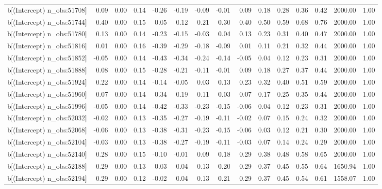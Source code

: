 \begin{table}[ht]
\begin{tabular}{rrrrrrrrrrrrrrr}
  b[(Intercept) n\_obs:51708] & 0.09 & 0.00 & 0.14 & -0.26 & -0.19 & -0.09 & -0.01 & 0.09 & 0.18 & 0.28 & 0.36 & 0.42 & 2000.00 & 1.00 \\ 
  b[(Intercept) n\_obs:51744] & 0.40 & 0.00 & 0.15 & 0.05 & 0.12 & 0.21 & 0.30 & 0.40 & 0.50 & 0.59 & 0.68 & 0.76 & 2000.00 & 1.00 \\ 
  b[(Intercept) n\_obs:51780] & 0.13 & 0.00 & 0.14 & -0.23 & -0.15 & -0.03 & 0.04 & 0.13 & 0.23 & 0.31 & 0.40 & 0.47 & 2000.00 & 1.00 \\ 
  b[(Intercept) n\_obs:51816] & 0.01 & 0.00 & 0.16 & -0.39 & -0.29 & -0.18 & -0.09 & 0.01 & 0.11 & 0.21 & 0.32 & 0.44 & 2000.00 & 1.00 \\ 
  b[(Intercept) n\_obs:51852] & -0.05 & 0.00 & 0.14 & -0.43 & -0.34 & -0.24 & -0.14 & -0.05 & 0.04 & 0.12 & 0.23 & 0.31 & 2000.00 & 1.00 \\ 
  b[(Intercept) n\_obs:51888] & 0.08 & 0.00 & 0.15 & -0.28 & -0.21 & -0.11 & -0.01 & 0.09 & 0.18 & 0.27 & 0.37 & 0.44 & 2000.00 & 1.00 \\ 
  b[(Intercept) n\_obs:51924] & 0.22 & 0.00 & 0.14 & -0.14 & -0.05 & 0.03 & 0.13 & 0.23 & 0.32 & 0.40 & 0.51 & 0.59 & 2000.00 & 1.00 \\ 
  b[(Intercept) n\_obs:51960] & 0.07 & 0.00 & 0.14 & -0.34 & -0.19 & -0.11 & -0.03 & 0.07 & 0.17 & 0.25 & 0.35 & 0.44 & 2000.00 & 1.00 \\ 
  b[(Intercept) n\_obs:51996] & -0.05 & 0.00 & 0.14 & -0.42 & -0.33 & -0.23 & -0.15 & -0.06 & 0.04 & 0.12 & 0.23 & 0.31 & 2000.00 & 1.00 \\ 
  b[(Intercept) n\_obs:52032] & -0.02 & 0.00 & 0.13 & -0.35 & -0.27 & -0.19 & -0.11 & -0.02 & 0.07 & 0.15 & 0.24 & 0.32 & 2000.00 & 1.00 \\ 
  b[(Intercept) n\_obs:52068] & -0.06 & 0.00 & 0.13 & -0.38 & -0.31 & -0.23 & -0.15 & -0.06 & 0.03 & 0.12 & 0.21 & 0.30 & 2000.00 & 1.00 \\ 
  b[(Intercept) n\_obs:52104] & -0.03 & 0.00 & 0.13 & -0.38 & -0.27 & -0.19 & -0.11 & -0.03 & 0.07 & 0.14 & 0.24 & 0.29 & 2000.00 & 1.00 \\ 
  b[(Intercept) n\_obs:52140] & 0.28 & 0.00 & 0.15 & -0.10 & -0.01 & 0.09 & 0.18 & 0.29 & 0.38 & 0.48 & 0.58 & 0.65 & 2000.00 & 1.00 \\ 
  b[(Intercept) n\_obs:52188] & 0.29 & 0.00 & 0.13 & -0.03 & 0.04 & 0.13 & 0.20 & 0.29 & 0.37 & 0.45 & 0.55 & 0.64 & 1650.94 & 1.00 \\ 
  b[(Intercept) n\_obs:52194] & 0.29 & 0.00 & 0.12 & -0.02 & 0.04 & 0.13 & 0.21 & 0.29 & 0.37 & 0.45 & 0.54 & 0.61 & 1558.07 & 1.00 \\ 

\end{tabular}
\end{table}
